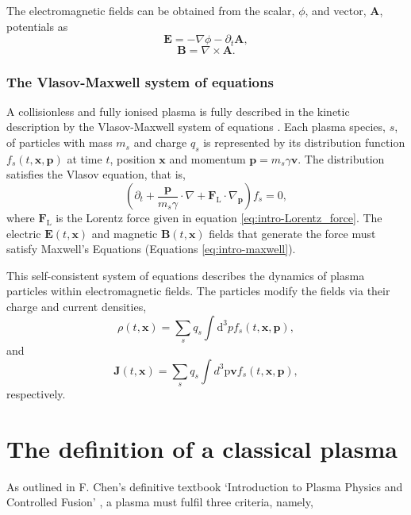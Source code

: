 The electromagnetic fields can be obtained from the scalar, $\phi$, and vector, $\mathbf{A}$, potentials as  \cite{steaneRelativityMadeRelatively2012}
\begin{equation}
	\mathbf{E} = -\nabla \phi - \partial_t \mathbf{A},
\end{equation}
\begin{equation}
	\mathbf{B} = \nabla \times \mathbf{A}.
\end{equation}

\subsubsection{The Vlasov-Maxwell system of equations}\label{sec:ch1-vlasov}
A collisionless and fully ionised plasma is fully described in the kinetic description by the Vlasov-Maxwell system of equations \cite{derouillatSmileiCollaborativeOpensource2018}. Each plasma species, $s$, of particles with mass $m_s$ and charge $q_s$ is represented by its distribution function $f_s(t,\mathbf{x},\mathbf{p})$ at time $t$, position $\mathbf{x}$ and momentum $\mathbf{p} = m_s \gamma \mathbf{v}$. The distribution satisfies the Vlasov equation, that is,
\begin{equation}\label{eq:intro-vlasov}
	(\partial_t + \frac{\mathbf{p}}{m_s\gamma} \cdot \nabla + \mathbf{F}_\mathrm{L} \cdot \nabla_\mathbf{p})f_s = 0,
\end{equation}
where $\mathbf{F}_\mathrm{L}$ is the Lorentz force given in equation \ref{eq:intro-Lorentz_force}. The electric $\mathbf{E}(t,\mathbf{x})$ and magnetic $\mathbf{B}(t,\mathbf{x})$ fields that generate the force must satisfy Maxwell's Equations (Equations \ref{eq:intro-maxwell}).

This self-consistent system of equations describes the dynamics of plasma particles within electromagnetic fields. The particles modify the fields via their charge and current densities,
\begin{equation}\label{eq:intro-rho}
	\rho(t,\mathbf{x}) = \sum_s q_s \int \mathrm{d}^3pf_s(t,\mathbf{x},\mathbf{p}),
\end{equation}
and 
\begin{equation}\label{eq:intro-J}
	\mathbf{J}(t,\mathbf{x}) = \sum_s q_s \int d^3\mathrm{p}\mathbf{v}f_s(t,\mathbf{x},\mathbf{p}),
\end{equation}
respectively.

\section{\label{sec:plasma_def}The definition of a classical plasma}
As outlined in F. Chen's definitive textbook `Introduction to Plasma Physics and Controlled Fusion' \cite{chenIntroductionPlasmaPhysics2016}, a plasma must fulfil three criteria, namely,

